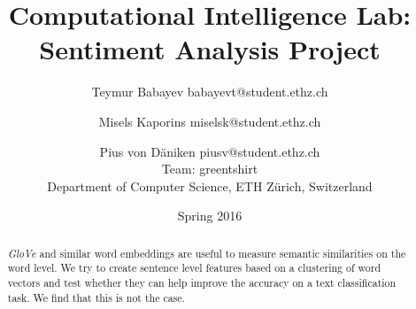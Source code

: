 \documentclass[a4paper, 11pt, notitlepage]{article}
\title{Computational Intelligence Lab:\\Sentiment Analysis Project}
\author{Teymur Babayev babayevt@student.ethz.ch \and Misels Kaporins miselsk@student.ethz.ch \and Pius von D\"aniken piusv@student.ethz.ch \\
Team: greentshirt \\
Department of Computer Science, ETH Z\"urich, Switzerland
}
\date{Spring 2016}
\begin{document}
\maketitle

\begin{abstract}
    \textit{GloVe} and similar word embeddings are useful to measure semantic
    similarities on the word level. We try to create sentence level features
    based on a clustering of word vectors and test whether they can help
    improve the accuracy on a text classification task. We find that this is not
    the case.
\end{abstract}









\end{document}
